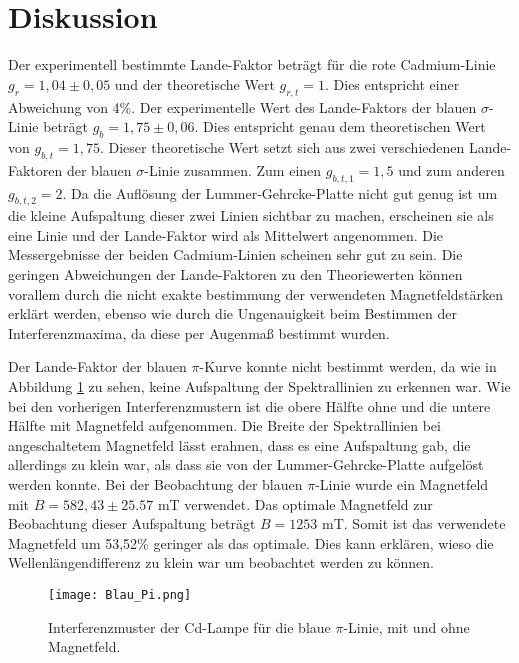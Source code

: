 \section{Diskussion}
\label{sec:Diskussion}
Der experimentell bestimmte Lande-Faktor beträgt für die rote Cadmium-Linie $g_r = 1,04 \pm 0,05$ und der 
theoretische Wert $g_{r,t} = 1$. Dies entspricht einer Abweichung von 4\%.
Der experimentelle Wert des Lande-Faktors der blauen $\sigma$-Linie beträgt $g_b = 1,75 \pm 0,06$. Dies entspricht genau dem 
theoretischen Wert von $g_{b,t} = 1,75$. Dieser theoretische Wert setzt sich aus zwei verschiedenen Lande-Faktoren der 
blauen $\sigma$-Linie zusammen. Zum einen $g_{b,t,1} = 1,5$ und zum anderen $g_{b,t,2} =2$. Da die Auflösung der Lummer-Gehrcke-Platte 
nicht gut genug ist um die kleine Aufspaltung dieser zwei Linien sichtbar zu machen, erscheinen sie als eine Linie und der 
Lande-Faktor wird als Mittelwert angenommen.
Die Messergebnisse der beiden Cadmium-Linien scheinen sehr gut zu sein. Die geringen Abweichungen der Lande-Faktoren zu den 
Theoriewerten können vorallem durch die nicht exakte bestimmung der verwendeten Magnetfeldstärken erklärt werden, ebenso wie 
durch die Ungenauigkeit beim Bestimmen der Interferenzmaxima, da diese per Augenmaß bestimmt wurden.

Der Lande-Faktor der blauen $\pi$-Kurve konnte nicht bestimmt werden, da wie in Abbildung \ref{fig:blau2} zu sehen, keine Aufspaltung 
der Spektrallinien zu erkennen war. Wie bei den vorherigen Interferenzmustern ist die obere Hälfte ohne und die untere Hälfte 
mit Magnetfeld aufgenommen. Die Breite der Spektrallinien bei angeschaltetem Magnetfeld lässt erahnen, 
dass es eine Aufspaltung gab, die allerdings zu klein war, als dass sie von der Lummer-Gehrcke-Platte aufgelöst werden konnte.
Bei der Beobachtung der blauen $\pi$-Linie wurde ein Magnetfeld mit $B = 582,43 \pm 25.57$ mT verwendet. Das optimale Magnetfeld 
zur Beobachtung dieser Aufspaltung beträgt $B = 1253$ mT. Somit ist das verwendete Magnetfeld um 53,52\% geringer als das optimale. 
Dies kann erklären, wieso die Wellenlängendifferenz zu klein war um beobachtet werden zu können.

\begin{figure}[H]
    \centering
    \texttt{[image: Blau\_Pi.png]}
    \vspace{-10pt}
    \caption{Interferenzmuster der Cd-Lampe für die blaue $\pi$-Linie, mit und ohne Magnetfeld.}
    \label{fig:blau2}
  \end{figure}

